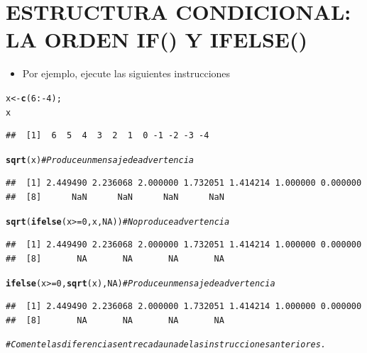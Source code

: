 \documentclass[12pt,letterpaper]{article}\usepackage[]{graphicx}\usepackage[]{color}
\makeatletter
\newcommand{\hlnum}[1]{\textcolor[rgb]{0.686,0.059,0.569}{#1}}%
\newcommand{\hlcom}[1]{\textcolor[rgb]{0.678,0.584,0.686}{\textit{#1}}}%
\newcommand{\hlopt}[1]{\textcolor[rgb]{0,0,0}{#1}}%
\newcommand{\hlstd}[1]{\textcolor[rgb]{0.345,0.345,0.345}{#1}}%
\newcommand{\hlkwb}[1]{\textcolor[rgb]{0.69,0.353,0.396}{#1}}%
\newcommand{\hlkwd}[1]{\textcolor[rgb]{0.737,0.353,0.396}{\textbf{#1}}}%
\newenvironment{kframe}{%
 \def\at@end@of@kframe{}%
 \ifinner\ifhmode%
  \def\at@end@of@kframe{\end{minipage}}%
  \begin{minipage}{\columnwidth}%
 \fi\fi%
 \def\FrameCommand##1{\hskip\@totalleftmargin \hskip-\fboxsep
 \colorbox{shadecolor}{##1}\hskip-\fboxsep
     \hskip-\linewidth \hskip-\@totalleftmargin \hskip\columnwidth}%
 \MakeFramed {\advance\hsize-\width
   \@totalleftmargin\z@ \linewidth\hsize
   \@setminipage}}%
 {\par\unskip\endMakeFramed%
 \at@end@of@kframe}
\newenvironment{knitrout}{}{} %
\makeatother
\begin{document}
\section {ESTRUCTURA CONDICIONAL: LA ORDEN IF() Y IFELSE()}
\begin{itemize}
\item Por ejemplo, ejecute las siguientes instrucciones
\end {itemize}
\begin{knitrout}
\color{fgcolor}\begin{kframe}
\begin{alltt}
\hlstd{x} \hlkwb{<-} \hlkwd{c}\hlstd{(}\hlnum{6}\hlopt{:-}\hlnum{4}\hlstd{);}
\hlstd{x}
\end{alltt}
\begin{verbatim}
##  [1]  6  5  4  3  2  1  0 -1 -2 -3 -4
\end{verbatim}
\begin{alltt}
\hlkwd{sqrt}\hlstd{(x)} \hlcom{# Produce un mensaje de advertencia}
\end{alltt}


{\ttfamily\noindent\color{warningcolor}{\#\# Warning in sqrt(x): Se han producido NaNs}}\begin{verbatim}
##  [1] 2.449490 2.236068 2.000000 1.732051 1.414214 1.000000 0.000000
##  [8]      NaN      NaN      NaN      NaN
\end{verbatim}
\begin{alltt}
\hlkwd{sqrt}\hlstd{(}\hlkwd{ifelse}\hlstd{(x} \hlopt{>=} \hlnum{0}\hlstd{, x,} \hlnum{NA}\hlstd{))} \hlcom{# No produce advertencia}
\end{alltt}
\begin{verbatim}
##  [1] 2.449490 2.236068 2.000000 1.732051 1.414214 1.000000 0.000000
##  [8]       NA       NA       NA       NA
\end{verbatim}
\begin{alltt}
\hlkwd{ifelse}\hlstd{(x} \hlopt{>=} \hlnum{0}\hlstd{,} \hlkwd{sqrt}\hlstd{(x),} \hlnum{NA}\hlstd{)} \hlcom{# Produce un mensaje de advertencia}
\end{alltt}


{\ttfamily\noindent\color{warningcolor}{\#\# Warning in sqrt(x): Se han producido NaNs}}\begin{verbatim}
##  [1] 2.449490 2.236068 2.000000 1.732051 1.414214 1.000000 0.000000
##  [8]       NA       NA       NA       NA
\end{verbatim}
\begin{alltt}
\hlcom{# Comente las diferencias entre cada una de las instrucciones anteriores.}
\end{alltt}
\end{kframe}
\end{knitrout}
\newpage
\end{document}
